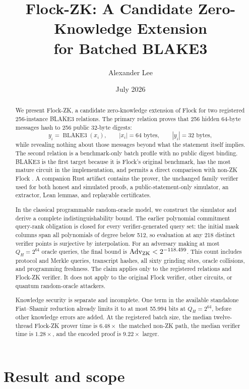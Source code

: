 \documentclass[11pt]{article}
\title{Flock-ZK: A Candidate Zero-Knowledge Extension\\
for Batched BLAKE3}
\author{Alexander Lee}
\date{July 2026}
\theoremstyle{definition}
\newcommand{\Adv}{\operatorname{Adv}}
\begin{document}
\maketitle

\begin{abstract}
We present Flock-ZK, a candidate zero-knowledge extension of Flock for two
registered 256-instance BLAKE3 relations.  The primary relation proves that
256 hidden 64-byte messages hash to 256 public 32-byte digests:
\[
  y_i=\operatorname{BLAKE3}(x_i),
  \qquad |x_i|=64\text{ bytes},
  \qquad |y_i|=32\text{ bytes},
\]
while revealing nothing about those messages beyond what the statement itself
implies.  The second relation is a benchmark-only batch profile with no public
digest binding.  BLAKE3 is the first target because it is Flock's original
benchmark, has the most mature circuit in the implementation, and permits a
direct comparison with non-ZK Flock \cite{Flock}.  A companion Rust artifact
contains the prover, the unchanged family verifier used for both honest and
simulated proofs, a public-statement-only simulator, an extractor, Lean lemmas,
and replayable certificates.

In the classical programmable random-oracle model, we construct the simulator
and derive a complete indistinguishability bound.  The earlier polynomial
commitment query-rank obligation is closed for every verifier-generated query
set: the initial mask columns span all polynomials of degree below 512, so
evaluation at any 218 distinct verifier points is surjective by interpolation.
For an adversary making at most $Q_H=2^{64}$ oracle queries, the final bound is
$\Adv_{\rm ZK}<2^{-118.499}$.  This count includes protocol and Merkle queries,
transcript hashes, all sixty grinding sites, oracle collisions, and programming
freshness.  The claim applies only to the registered relations and Flock-ZK
verifier.  It does not apply to the original Flock verifier, other circuits, or
quantum random-oracle attackers.

Knowledge security is separate and incomplete.  One term in the available
standalone Fiat--Shamir reduction already limits it to at most 55.994 bits at
$Q_H=2^{64}$, before other knowledge errors are added.  At the registered batch
size, the median twelve-thread Flock-ZK prover time is $6.48\times$ the matched
non-ZK path, the median verifier time is $1.28\times$, and the encoded proof is
$9.22\times$ larger.
\end{abstract}

\section{Result and scope}\label{sec:scope}
\end{document}
